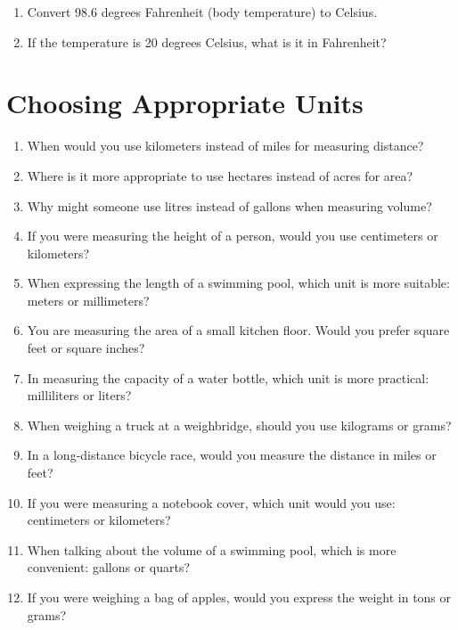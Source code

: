 \documentclass{article}
\begin{document}
\begin{enumerate}
    \item Convert 98.6 degrees Fahrenheit (body temperature) to Celsius.
    \item If the temperature is 20 degrees Celsius, what is it in Fahrenheit?
\end{enumerate}

\section*{Choosing Appropriate Units}

\begin{enumerate}
    \item When would you use kilometers instead of miles for measuring distance?
    \item Where is it more appropriate to use hectares instead of acres for area?
    \item Why might someone use litres instead of gallons when measuring volume?
    \item If you were measuring the height of a person, would you use centimeters or kilometers?
    \item When expressing the length of a swimming pool, which unit is more suitable: meters or millimeters?
    \item You are measuring the area of a small kitchen floor. Would you prefer square feet or square inches?
    \item In measuring the capacity of a water bottle, which unit is more practical: milliliters or liters?
    \item When weighing a truck at a weighbridge, should you use kilograms or grams?
    \item In a long-distance bicycle race, would you measure the distance in miles or feet?
    \item If you were measuring a notebook cover, which unit would you use: centimeters or kilometers?
    \item When talking about the volume of a swimming pool, which is more convenient: gallons or quarts?
    \item If you were weighing a bag of apples, would you express the weight in tons or grams?
\end{enumerate}
\end{document}
